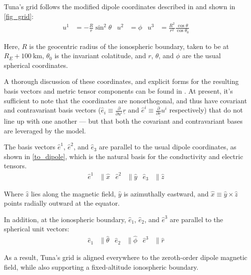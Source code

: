 \documentclass{article}
\newcommand{\lysaki}{\ensuremath{u^i}\xspace}
\newcommand{\lysakx}{\ensuremath{u^1}\xspace}
\newcommand{\lysaky}{\ensuremath{u^2}\xspace}
\newcommand{\lysakz}{\ensuremath{u^3}\xspace}
\newcommand{\ehat}{\ensuremath{\hat{e}}\xspace}
\newcommand{\xhat}{\ensuremath{\hat{x}}\xspace}
\newcommand{\yhat}{\ensuremath{\hat{y}}\xspace}
\newcommand{\zhat}{\ensuremath{\hat{z}}\xspace}
\renewcommand{\vec}[1]{\ensuremath{\underline{#1}}}
\newcommand{\dd}[1]{\ensuremath{ \frac{\partial}{\partial #1} }\xspace}
\begin{document}

Tuna's grid follows the modified dipole coordinates described in \cite{lysak_2004} and shown in \cref{fig_grid}:
\begin{align}
  \label{def_coords}
  \lysakx & = - \frac{R}{r} \sin^2 \theta &
  \lysaky & = \phi &
  \lysakz & = \frac{R^2}{r^2} \frac{\cos \theta}{\cos \theta_0}
\end{align}

Here, $R$ is the geocentric radius of the ionospheric boundary, taken to be at $R_E + \SI{100}{\km}$, $\theta_0$ is the invariant colatitude, and $r$, $\theta$, and $\phi$ are the usual spherical coordinates.

A thorough discussion of these coordinates, and explicit forms for the resulting basis vectors and metric tensor components can be found in \cite{lysak_2004}. At present, it's sufficient to note that the coordinates are nonorthogonal, and thus have covariant and contravariant basis vectors (${\ehat_i \equiv \dd{\lysaki}\vec{r}}$ and ${\ehat^i \equiv \dd{\vec{r}}\lysaki}$ respectively) that do not line up with one another --- but that both the covariant and contravariant bases are leveraged by the model.

The basis vectors $\ehat^1$, $\ehat^2$, and $\ehat_3$ are parallel to the usual dipole coordinates, as shown in \cref{to_dipole}, which is the natural basis for the conductivity and electric tensors.
\begin{align}
    \label{to_dipole}
    \ehat^1 &\parallel \xhat &
    \ehat^2 &\parallel \yhat &
    \ehat_3 &\parallel \zhat
\end{align}

Where $\zhat$ lies along the magnetic field, $\yhat$ is azimuthally eastward, and $\xhat \equiv \yhat \times \zhat$ points radially outward at the equator.

In addition, at the ionospheric boundary, $\ehat_1$, $\ehat_2$, and $\ehat^3$ are parallel to the spherical unit vectors:
\begin{align}
  \ehat_1 &\parallel \hat{\theta} &
  \ehat_2 &\parallel \hat{\phi} &
  \ehat^3 &\parallel \hat{r}
\end{align}

As a result, Tuna's grid is aligned everywhere to the zeroth-order dipole magnetic field, while also supporting a fixed-altitude ionospheric boundary.
\end{document}
